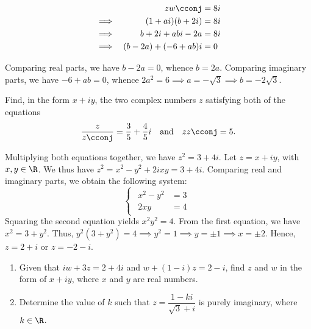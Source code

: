 \documentclass{echw}
\begin{document}
    \solution
        \begin{alignat*}{2}
            &&zw\cconj &= 8i\\
            \implies&& (1 + ai)(b+2i) &= 8i\\
            \implies&& b + 2i + abi - 2a &= 8i\\
            \implies&& (b-2a) + (-6 + ab)i &= 0
        \end{alignat*}

        Comparing real parts, we have $b - 2a = 0$, whence $b = 2a$. Comparing imaginary parts, we have $-6 + ab = 0$, whence $2a^2 = 6 \implies a = -\sqrt{3} \implies b = -2\sqrt3$.


    \problem{}
        Find, in the form $x + iy$, the two complex numbers $z$ satisfying both of the equations
        \[
            \dfrac{z}{z\cconj} = \dfrac35 + \dfrac45 i \quad \text{and} \quad zz\cconj = 5.
        \]

    \solution
        Multiplying both equations together, we have $z^2 = 3 + 4i$. Let $z = x + iy$, with $x, y \in \R$. We thus have $z^2 = x^2 - y^2 + 2ixy = 3 + 4i$. Comparing real and imaginary parts, we obtain the following system:
        \[
            \begin{cases}
                \begin{aligned}
                    x^2 - y^2 &= 3\\
                    2xy &= 4
                \end{aligned}
            \end{cases}
        \]
        Squaring the second equation yields $x^2y^2 = 4$. From the first equation, we have $x^2 = 3 + y^2$. Thus, $y^2(3 + y^2) = 4 \implies y^2 = 1 \implies y = \pm 1 \implies x = \pm 2$. Hence, $z = 2 + i$ or $z = -2-i$.


    \problem{}
        \begin{enumerate}
            \item Given that $iw + 3z = 2 + 4i$ and $w + (1 - i)z = 2 - i$, find $z$ and $w$ in the form of $x + iy$, where $x$ and $y$ are real numbers.
            \item Determine the value of $k$ such that $z = \dfrac{1-ki}{\sqrt3 + i}$ is purely imaginary, where $k \in \R$.
        \end{enumerate}

    \solution
\end{document}
